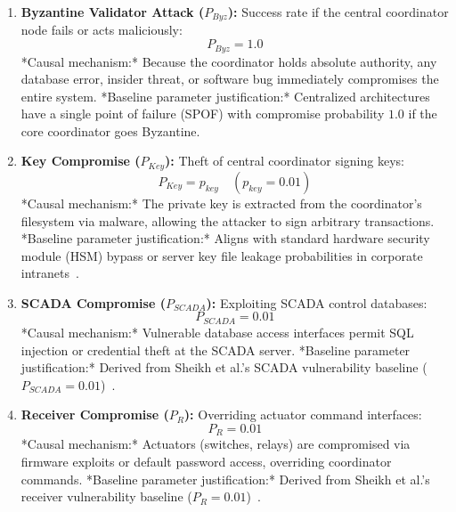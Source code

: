 \documentclass[10pt,twocolumn,journal]{IEEEtran}
\begin{document}
\begin{enumerate}[leftmargin=*]
    \item \textbf{Byzantine Validator Attack ($P_{Byz}$):} Success rate if the central coordinator node fails or acts maliciously:
    \begin{equation}
    P_{Byz} = 1.0
    \end{equation}
    *Causal mechanism:* Because the coordinator holds absolute authority, any database error, insider threat, or software bug immediately compromises the entire system.
    *Baseline parameter justification:* Centralized architectures have a single point of failure (SPOF) with compromise probability $1.0$ if the core coordinator goes Byzantine.

    \item \textbf{Key Compromise ($P_{Key}$):} Theft of central coordinator signing keys:
    \begin{equation}
    P_{Key} = p_{key} \quad (p_{key} = 0.01)
    \end{equation}
    *Causal mechanism:* The private key is extracted from the coordinator's filesystem via malware, allowing the attacker to sign arbitrary transactions.
    *Baseline parameter justification:* Aligns with standard hardware security module (HSM) bypass or server key file leakage probabilities in corporate intranets~\cite{sridhar2012}.

    \item \textbf{SCADA Compromise ($P_{SCADA}$):} Exploiting SCADA control databases:
    \begin{equation}
    P_{SCADA} = 0.01
    \end{equation}
    *Causal mechanism:* Vulnerable database access interfaces permit SQL injection or credential theft at the SCADA server.
    *Baseline parameter justification:* Derived from Sheikh et al.'s SCADA vulnerability baseline ($P_{SCADA} = 0.01$)~\cite{sheikh2020}.

    \item \textbf{Receiver Compromise ($P_R$):} Overriding actuator command interfaces:
    \begin{equation}
    P_R = 0.01
    \end{equation}
    *Causal mechanism:* Actuators (switches, relays) are compromised via firmware exploits or default password access, overriding coordinator commands.
    *Baseline parameter justification:* Derived from Sheikh et al.'s receiver vulnerability baseline ($P_{R} = 0.01$)~\cite{sheikh2020}.
\end{enumerate}
\end{document}
